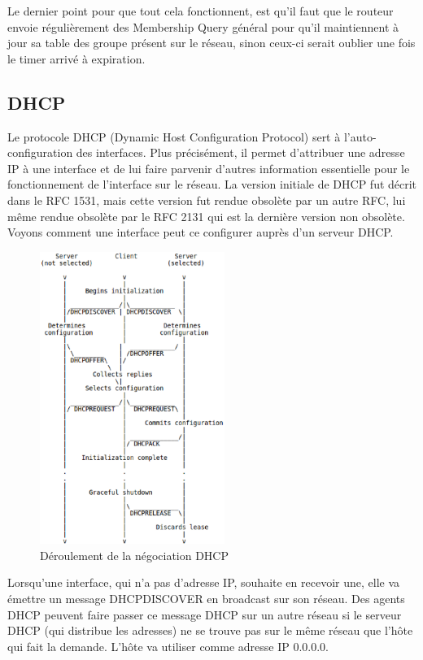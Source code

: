 Le dernier point pour que tout cela fonctionnent, est qu'il faut que le routeur envoie
régulièrement des Membership Query général pour qu'il maintiennent à jour sa table des
groupe présent sur le réseau, sinon ceux-ci serait oublier une fois le timer arrivé à expiration.

\subsection{DHCP}
Le protocole DHCP (Dynamic Host Configuration Protocol) sert à l'auto-configuration
des interfaces. Plus précisément, il  permet d'attribuer une adresse IP à une
interface et de lui faire parvenir d'autres information essentielle pour le
fonctionnement de l'interface sur le réseau. La version initiale de DHCP fut décrit
dans le RFC 1531\cite{url-RFC-DHCP1}, mais cette version fut rendue obsolète par un autre
RFC, lui même rendue obsolète par le RFC 2131\cite{url-RFC-DHCP2} qui est la dernière version non
obsolète. Voyons comment une interface peut ce configurer auprès d'un serveur DHCP.

\begin{figure}
\centering
\includegraphics[width=6cm]{./pics/timeline_dhcp.eps}
\caption{Déroulement de la négociation DHCP}
\label{fig:timelinedhcp}
\end{figure}

Lorsqu'une interface, qui n'a pas d'adresse IP, souhaite en recevoir une, elle
va émettre un message DHCPDISCOVER en broadcast sur son réseau. Des agents DHCP
peuvent faire passer
ce message DHCP sur un autre réseau si le serveur DHCP (qui distribue les
adresses) ne se trouve pas sur le même réseau que l'hôte qui fait la demande.
L'hôte va utiliser comme adresse IP 0.0.0.0.

